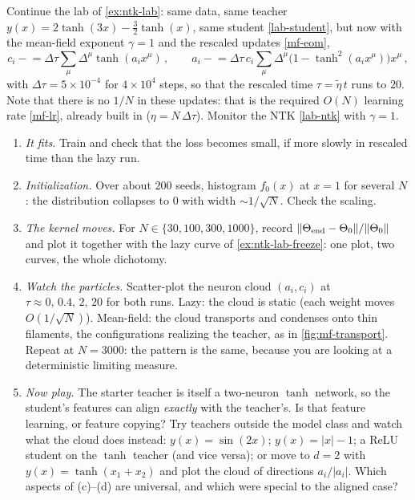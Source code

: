 \documentclass[11pt]{article}
\begin{document}
\begin{exercise}
\label{ex:mf-lab}
\important
Continue the lab of \cref{ex:ntk-lab}: same data, same teacher $y(x) = 2\tanh(3x)-\frac{3}{2}\tanh(x)$, same student \eqref{lab-student}, but now with the mean-field exponent $\gamma = 1$ and the rescaled updates \eqref{mf-eom},
%
\begin{equation}
    c_i \mathrel{-}= \Delta\tau\sum_\mu\Delta^\mu\tanh(a_ix^\mu)\,,\qquad a_i \mathrel{-}= \Delta\tau\,c_i\sum_\mu\Delta^\mu\big(1-\tanh^2(a_ix^\mu)\big)x^\mu\,,
\end{equation}
%
with $\Delta\tau = 5\times10^{-4}$ for $4\times10^4$ steps, so that the rescaled time $\tau = \tilde\eta\, t$ runs to $20$. Note that there is no $1/N$ in these updates: that is the required $O(N)$ learning rate \eqref{mf-lr}, already built in ($\eta = N\,\Delta\tau$). Monitor the NTK \eqref{lab-ntk} with $\gamma=1$.
\begin{enumerate}
    \item \emph{It fits.} Train and check that the loss becomes small, if more slowly in rescaled time than the lazy run.
    \item \emph{Initialization.} Over about $200$ seeds, histogram $f_0(x)$ at $x=1$ for several $N$: the distribution collapses to $0$ with width $\sim1/\sqrt N$. Check the scaling.
    \item \emph{The kernel moves.} For $N\in\{30,100,300,1000\}$, record $\|\Theta_{\rm end}-\Theta_0\|/\|\Theta_0\|$ and plot it together with the lazy curve of \cref{ex:ntk-lab-freeze}: one plot, two curves, the whole dichotomy.
    \item \emph{Watch the particles.} Scatter-plot the neuron cloud $(a_i,c_i)$ at $\tau\approx0,\,0.4,\,2,\,20$ for both runs. Lazy: the cloud is static (each weight moves $O(1/\sqrt N)$). Mean-field: the cloud transports and condenses onto thin filaments, the configurations realizing the teacher, as in \cref{fig:mf-transport}. Repeat at $N=3000$: the pattern is the same, because you are looking at a deterministic limiting measure.
    \item \emph{Now play.} The starter teacher is itself a two-neuron $\tanh$ network, so the student's features can align \emph{exactly} with the teacher's. Is that feature learning, or feature copying? Try teachers outside the model class and watch what the cloud does instead: $y(x) = \sin(2x)$; $y(x) = |x|-1$; a ReLU student on the $\tanh$ teacher (and vice versa); or move to $d=2$ with $y(x) = \tanh(x_1+x_2)$ and plot the cloud of directions $a_i/|a_i|$. Which aspects of (c)--(d) are universal, and which were special to the aligned case?
\end{enumerate}
\end{exercise}
\end{document}
